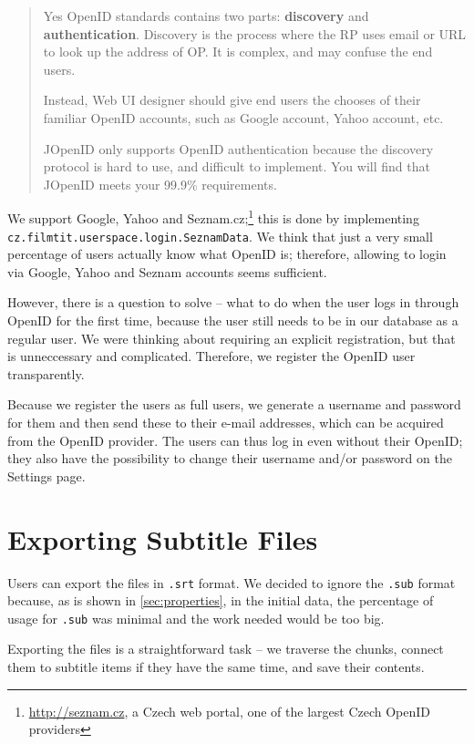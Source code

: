 \begin{quote}Yes OpenID standards contains two parts: \textbf{discovery} and \textbf{authentication}. Discovery is the process where the RP uses email or URL to look up the address of OP. It is complex, and may confuse the end users.

Instead, Web UI designer should give end users the chooses of their familiar OpenID accounts, such as Google account, Yahoo account, etc.

JOpenID only supports OpenID authentication because the discovery protocol is hard to use, and difficult to implement. You will find that JOpenID meets your 99.9\% requirements.
\end{quote}

We support Google, Yahoo and Seznam.cz;\footnote{\url{http://seznam.cz}, a Czech web portal, one of the largest Czech OpenID providers} this is done by implementing {\tt{cz.filmtit.userspace.login.SeznamData}}. We think that just a very small percentage of users actually know what OpenID is; therefore, allowing to login via Google, Yahoo and Seznam accounts seems sufficient.

However, there is a question to solve -- what to do when the user logs in through OpenID for the first time, because the user still needs to be in our database as a regular user. We were thinking about requiring an explicit registration, but that is unneccessary and complicated. Therefore, we register the OpenID user transparently.

Because we register the users as full users, we generate a username and password for them and then send these to their e-mail addresses, which  can be acquired from the OpenID provider. The users can thus log in even without their OpenID; they also have the possibility to change their username and/or password on the Settings page.


\section{Exporting Subtitle Files}
\label{sec:export}

Users can export the files in {\tt .srt} format. We decided to ignore the {\tt .sub} format because, as is shown in \ref{sec:properties}, in the initial data, the percentage of usage for {\tt .sub} was minimal and the work needed would be too big.

Exporting the files is a straightforward task -- we traverse the chunks, connect them to subtitle items if they have the same time, and save their contents.

